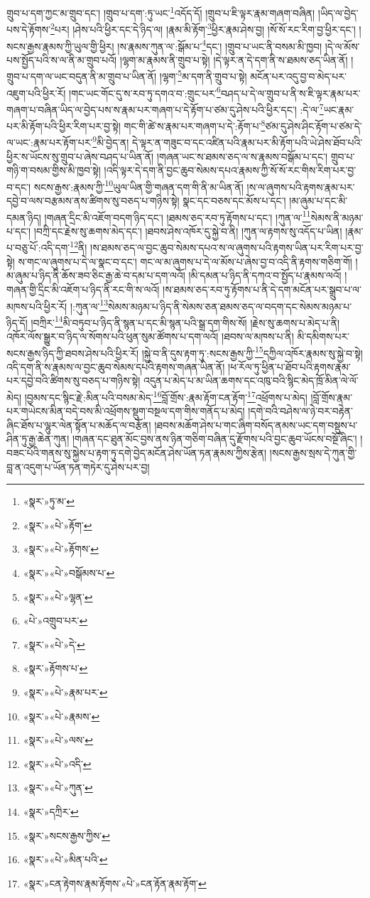 གྲུབ་པ་དག་ཀྱང་མ་གྲུབ་དང་། །གྲུབ་པ་དག་:ཏུ་ཡང་\footnote{«སྣར་»ཏུ་མ་}འདོད་དོ། །གྲུབ་པ་ཇི་ལྟར་རྣམ་གཞག་བཞིན། །ཡིད་ལ་བྱེད་པས་དེ་རྟོགས་\footnote{«སྣར་»«པེ་»རྟོག་}པར། །ཤེས་པའི་ཕྱིར་དང་དེ་ཉིད་ལ། །རྣམ་མི་རྟོག་\footnote{«སྣར་»«པེ་»རྟོགས་}ཕྱིར་རྣམ་ཤེས་བྱ། །སོ་སོ་རང་རིག་བྱ་ཕྱིར་དང་། །སངས་རྒྱས་རྣམས་ཀྱི་ཡུལ་གྱི་ཕྱིར། །ས་རྣམས་ཀུན་ལ་:སྒོམ་པ་\footnote{«སྣར་»«པེ་»བསྒོམས་པ་}དང་། །གྲུབ་པ་ཡང་ནི་བསམ་མི་ཁྱབ། །དེ་ལ་མོས་པས་སྤྱོད་པའི་ས་ལ་ནི་མ་གྲུབ་པའོ། །ལྷག་མ་རྣམས་ནི་གྲུབ་པ་སྟེ། །དེ་ལྟར་ན་དེ་དག་ནི་ས་ཐམས་ཅད་ཡིན་ནོ། །གྲུབ་པ་དག་ལ་ཡང་བདུན་ནི་མ་གྲུབ་པ་ཡིན་ནོ། །ལྷག་\footnote{«སྣར་»«པེ་»ལྷན་}མ་དག་ནི་གྲུབ་པ་སྟེ། མངོན་པར་འདུ་བྱ་བ་མེད་པར་འཇུག་པའི་ཕྱིར་རོ། །གང་ཡང་གོང་དུ་ས་རབ་ཏུ་དགའ་བ་:གྲུང་པར་\footnote{«པེ་»འགྲུབ་པར་}བཤད་པ་དེ་ལ་གྲུབ་པ་ནི་ས་ཇི་ལྟར་རྣམ་པར་གཞག་པ་བཞིན་ཡིད་ལ་བྱེད་པས་ས་རྣམ་པར་གཞག་པ་དེ་རྟོག་པ་ཙམ་དུ་ཤེས་པའི་ཕྱིར་དང་། :དེ་ལ་\footnote{«སྣར་»«པེ་»དེ་}ཡང་རྣམ་པར་མི་རྟོག་པའི་ཕྱིར་རིག་པར་བྱ་སྟེ། གང་གི་ཚེ་ས་རྣམ་པར་གཞག་པ་དེ་:རྟོག་པ་\footnote{«སྣར་»རྟོགས་པ་}ཙམ་དུ་ཤེས་ཤིང་རྟོག་པ་ཙམ་དེ་ལ་ཡང་:རྣམ་པར་རྟོག་པར་\footnote{«སྣར་»«པེ་»རྣམ་པར་}མི་བྱེད་ན། དེ་ལྟར་ན་གཟུང་བ་དང་འཛིན་པའི་རྣམ་པར་མི་རྟོག་པའི་ཡེ་ཤེས་ཐོབ་པའི་ཕྱིར་ས་ཡོངས་སུ་གྲུབ་པ་ཞེས་བཤད་པ་ཡིན་ནོ། །གཞན་ཡང་ས་ཐམས་ཅད་ལ་ས་རྣམས་བསྒོམ་པ་དང་། གྲུབ་པ་གཉི་ག་བསམ་གྱིས་མི་ཁྱབ་སྟེ། །འདི་ལྟར་དེ་དག་ནི་བྱང་ཆུབ་སེམས་དཔའ་རྣམས་ཀྱི་སོ་སོ་རང་གིས་རིག་པར་བྱ་བ་དང་། སངས་རྒྱས་:རྣམས་ཀྱི་\footnote{«སྣར་»«པེ་»རྣམས་}ཡུལ་ཡིན་གྱི་གཞན་དག་གི་ནི་མ་ཡིན་ནོ། །ས་ལ་ཞུགས་པའི་རྟགས་རྣམ་པར་དབྱེ་བ་ལས་བརྩམས་ནས་ཚིགས་སུ་བཅད་པ་གཉིས་སྟེ། སྣང་དང་བཅས་དང་མོས་པ་དང་། །མ་ཞུམ་པ་དང་མི་དམན་ཉིད། །གཞན་དྲིང་མི་འཇོག་བདག་ཉིད་དང་། །ཐམས་ཅད་རབ་ཏུ་རྟོགས་པ་དང་། །ཀུན་ལ་\footnote{«སྣར་»«པེ་»ལས་}སེམས་ནི་མཉམ་པ་དང་། །བཀྲི་དང་རྗེས་སུ་ཆགས་མེད་དང་། །ཐབས་ཤེས་འཁོར་དུ་སྐྱེ་བ་ནི། །ཀུན་ལ་རྟགས་སུ་འདོད་པ་ཡིན། །རྣམ་པ་བཅུ་པོ་:འདི་དག་\footnote{«སྣར་»«པེ་»འདི་}ནི། །ས་ཐམས་ཅད་ལ་བྱང་ཆུབ་སེམས་དཔའ་ས་ལ་ཞུགས་པའི་རྟགས་ཡིན་པར་རིག་པར་བྱ་སྟེ། ས་གང་ལ་ཞུགས་པ་དེ་ལ་སྣང་བ་དང་། གང་ལ་མ་ཞུགས་པ་དེ་ལ་མོས་པ་ཞེས་བྱ་བ་འདི་ནི་རྟགས་གཅིག་གོ། །མ་ཞུམ་པ་ཉིད་ནི་ཆོས་ཟབ་ཅིང་རྒྱ་ཆེ་བ་དམ་པ་དག་ལའོ། །མི་དམན་པ་ཉིད་ནི་དཀའ་བ་སྤྱོད་པ་རྣམས་ལའོ། །གཞན་གྱི་དྲིང་མི་འཇོག་པ་ཉིད་ནི་རང་གི་ས་ལའོ། །ས་ཐམས་ཅད་རབ་ཏུ་རྟོགས་པ་ནི་དེ་དག་མངོན་པར་སྒྲུབ་པ་ལ་མཁས་པའི་ཕྱིར་རོ། །:ཀུན་ལ་\footnote{«སྣར་»«པེ་»ཀུན་}སེམས་མཉམ་པ་ཉིད་ནི་སེམས་ཅན་ཐམས་ཅད་ལ་བདག་དང་སེམས་མཉམ་པ་ཉིད་དོ། །བཀྲིར་\footnote{«སྣར་»དཀྲིར་}མི་བཏུབ་པ་ཉིད་ནི་སྙན་པ་དང་མི་སྙན་པའི་སྒྲ་དག་གིས་སོ། །རྗེས་སུ་ཆགས་པ་མེད་པ་ནི། འཁོར་ལོས་སྒྱུར་བ་ཉིད་ལ་སོགས་པའི་ཕུན་སུམ་ཚོགས་པ་དག་ལའོ། །ཐབས་ལ་མཁས་པ་ནི། མི་དམིགས་པར་སངས་རྒྱས་ཉིད་ཀྱི་ཐབས་ཤེས་པའི་ཕྱིར་རོ། །སྐྱེ་བ་ནི་དུས་རྟག་ཏུ་:སངས་རྒྱས་ཀྱི་\footnote{«སྣར་»སངས་རྒྱས་ཀྱིས་}དཀྱིལ་འཁོར་རྣམས་སུ་སྐྱེ་བ་སྟེ། འདི་དག་ནི་ས་རྣམས་ལ་བྱང་ཆུབ་སེམས་དཔའི་རྟགས་གཞན་ཡིན་ནོ། །ཕ་རོལ་ཏུ་ཕྱིན་པ་ཐོབ་པའི་རྟགས་རྣམ་པར་དབྱེ་བའི་ཚིགས་སུ་བཅད་པ་གཉིས་སྟེ། འདུན་པ་མེད་པ་མ་ཡིན་ཆགས་དང་འཁུ་བའི་སྙིང་མེད་ཁྲོ་མིན་ལེ་ལོ་མེད། །བྱམས་དང་སྙིང་རྗེ་:མིན་པའི་བསམ་མེད་\footnote{«སྣར་»«པེ་»མིན་པའི་}བློ་གྲོས་:རྣམ་རྟོག་ངན་རྟོག་\footnote{«སྣར་»ངན་རྟེགས་རྣམ་རྟོགས་«པེ་»ངན་རྟོན་རྣམ་རྟོག་}འཕྲོགས་པ་མེད། །བློ་གྲོས་རྣམ་པར་གཡེངས་མིན་བདེ་བས་མི་འཕྲོགས་སྡུག་བསྔལ་དག་གིས་གནོད་པ་མེད། །དགེ་བའི་བཤེས་ལ་ཉེ་བར་བརྟེན་ཞིང་ཐོས་པ་ལྷུར་ལེན་སྟོན་པ་མཆོད་ལ་བརྩོན། །ཐབས་མཆོག་ཤེས་པ་གང་ཞིག་བསོད་ནམས་ཡང་དག་བསྡུས་པ་ཤིན་ཏུ་རྒྱ་ཆེན་ཀུན། །གཞན་དང་ཐུན་མོང་བྱས་ནས་ཉིན་གཅིག་བཞིན་དུ་རྫོགས་པའི་བྱང་ཆུབ་ཡོངས་བསྔོ་ཞིང་། །བཟང་པོའི་གནས་སུ་སྐྱེས་པ་རྟག་ཏུ་དགེ་བྱེད་མངོན་ཤེས་ཡོན་ཏན་རྣམས་ཀྱིས་རྩེན། །སངས་རྒྱས་སྲས་དེ་ཀུན་གྱི་བླ་ན་འདུག་པ་ཡོན་ཏན་གཏེར་དུ་ཤེས་པར་བྱ། 